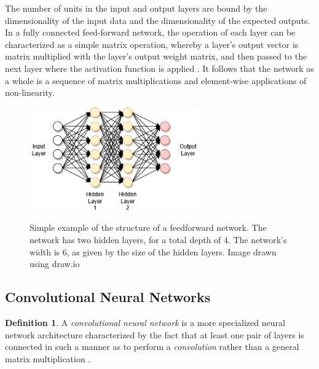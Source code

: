 \documentclass[12pt, titlepage]{report}
\theoremstyle{definition}
\newtheorem{definition}{Definition}
\begin{document}
The number of units in the input and output layers are bound by the dimensionality of the input data and the dimensionality of the expected outputs. In a fully connected feed-forward network, the operation of each layer can be characterized as a simple matrix operation, whereby a layer's output vector is matrix multiplied with the layer's output weight matrix, and then passed to the next layer where the activation function is applied \cite[p. 170-171]{goodfellow2016deep}. It follows that the network as a whole is a sequence of matrix multiplications and element-wise applications of non-linearity.

\begin{figure}
\centering
\includegraphics[width=0.65\textwidth]{img/feedforward_nn.png}\\
\caption{Simple example of the structure of a feedforward network. The network has two hidden layers, for a total depth of 4. The network's width is 6, as given by the size of the hidden layers. Image drawn using draw.io \cite{jgraph2018draw}}
\label{figure:feedforward}
\end{figure}



\subsection{Convolutional Neural Networks}
\begin{definition}
A \emph{convolutional neural network} is a more specialized neural network architecture characterized by the fact that at least one pair of layers is connected in such a manner as to perform a \textit{convolution} rather than a general matrix multiplication \cite[p. 326]{goodfellow2016deep}.
\end{definition}
\end{document}
